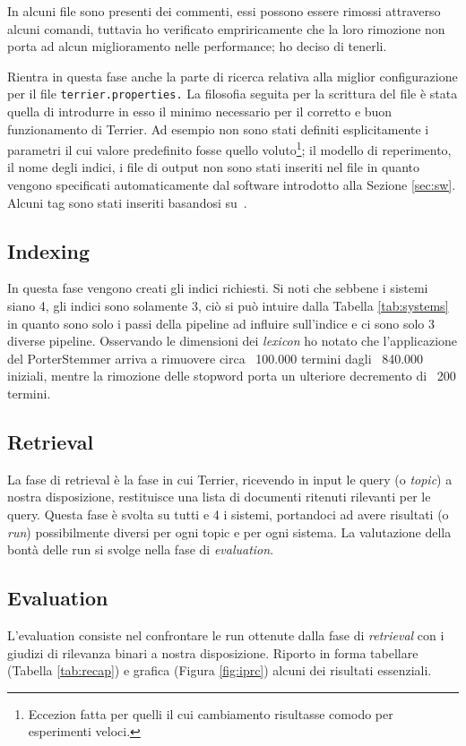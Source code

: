 \documentclass[letterpaper, 10 pt, conference]{ieeeconf}  %
\begin{document}
In alcuni file sono presenti dei commenti, essi possono essere rimossi attraverso alcuni comandi, tuttavia ho verificato empriricamente che la loro rimozione non porta ad alcun miglioramento nelle performance; ho deciso di tenerli.

Rientra in questa fase anche la parte di ricerca relativa alla miglior configurazione per il file \texttt{terrier.properties.} La filosofia seguita per la scrittura del file è stata quella di introdurre in esso il minimo necessario per il corretto e buon funzionamento di Terrier. Ad esempio non sono stati definiti esplicitamente i parametri il cui valore predefinito fosse quello voluto\footnote{Eccezion fatta per quelli il cui cambiamento risultasse comodo per esperimenti veloci.}; il modello di reperimento, il nome degli indici, i file di output non sono stati inseriti nel file in quanto vengono specificati automaticamente dal software introdotto alla Sezione \ref{sec:sw}. Alcuni tag sono stati inseriti basandosi su~\cite{besttags}.

\subsection{Indexing}\label{subsec:index}
In questa fase vengono creati gli indici richiesti. Si noti che sebbene i sistemi siano 4, gli indici sono solamente 3, ciò si può intuire dalla Tabella \ref{tab:systems} in quanto sono solo i passi della pipeline ad influire sull'indice e ci sono solo 3 diverse pipeline. Osservando le dimensioni dei \textit{lexicon} ho notato che l'applicazione del PorterStemmer arriva a rimuovere circa ~100.000 termini dagli ~840.000 iniziali, mentre la rimozione delle stopword porta un ulteriore decremento di ~200 termini.



\subsection{Retrieval}
La fase di retrieval è la fase in cui Terrier, ricevendo in input le query (o \textit{topic}) a nostra disposizione, restituisce una lista di documenti ritenuti rilevanti per le query. Questa fase è svolta su tutti e 4 i sistemi, portandoci ad avere risultati (o \textit{run}) possibilmente diversi per ogni topic e per ogni sistema. La valutazione della bontà delle run si svolge nella fase di \textit{evaluation}.
\subsection{Evaluation}
\label{subsec:eval}
L'evaluation consiste nel confrontare le run ottenute dalla fase di \textit{retrieval} con i giudizi di rilevanza binari a nostra disposizione. Riporto in forma tabellare (Tabella \ref{tab:recap}) e grafica (Figura \ref{fig:iprc}) alcuni dei risultati essenziali.
\end{document}
